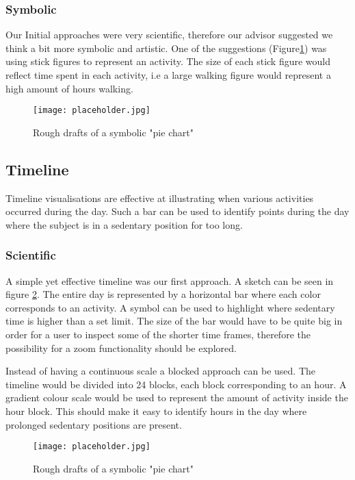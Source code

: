 \subsubsection{Symbolic}
Our Initial approaches were very scientific, therefore our advisor suggested we think a bit more symbolic and artistic. One of the suggestions (Figure\ref{fig:symbolicPie}) was using stick figures to represent an activity. The size of each stick figure would reflect time spent in each activity, i.e a large walking figure would represent a high amount of hours walking. %

\begin{figure}[h!]
	\centering
		\texttt{[image: placeholder.jpg]}
		\caption{\footnotesize Rough drafts of a symbolic "pie chart"}
		\label{fig:symbolicPie}
\end{figure}

\subsection{Timeline}
Timeline visualisations are effective at illustrating when various activities occurred during the day. Such a bar can be used to identify points during the day where the subject is in a sedentary position for too long.

\subsubsection{Scientific}
A simple yet effective timeline was our first approach. A sketch can be seen in figure \ref{fig:simpleTimeline}. The entire day is represented by a horizontal bar where each color corresponds to an activity. A symbol can be used to highlight where sedentary time is higher than a set limit. The size of the bar would have to be quite big in order for a user to inspect some of the shorter time frames, therefore the possibility for a zoom functionality should be explored.

Instead of having a continuous scale a blocked approach can be used. The timeline would be divided into 24 blocks, each block corresponding to an hour. A gradient colour scale would be used to represent the amount of activity inside the hour block. This should make it easy to identify hours in the day where prolonged sedentary positions are present.

\begin{figure}[h!]
	\centering
		\texttt{[image: placeholder.jpg]}
		\caption{\footnotesize Rough drafts of a symbolic "pie chart"}
		\label{fig:simpleTimeline}
\end{figure}

